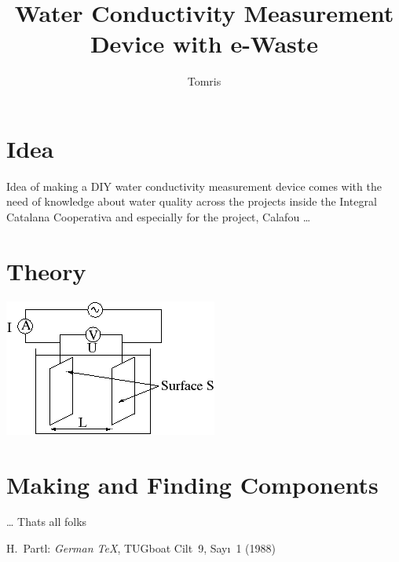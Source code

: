 \documentclass[a4paper,11pt]{article}
\author{Tomris}
\title{Water Conductivity Measurement Device with e-Waste}
\begin{document}
\maketitle
\tableofcontents
\section{Idea}
Idea of making a DIY water conductivity measurement device comes with the need of knowledge about water quality across the projects inside the Integral Catalana Cooperativa and especially for the project, Calafou \ldots{}
\section{Theory}

\begin{center}
  \includegraphics{Conductimetrie-schema.png}
\end{center}

\section{Making and Finding Components}
\ldots{} Thats all folks
\begin{thebibliography}{99}
 H.~Partl:
\emph{German \TeX},
TUGboat Cilt~9, Sayı~1 (1988)
\end{thebibliography}
\end{document}
